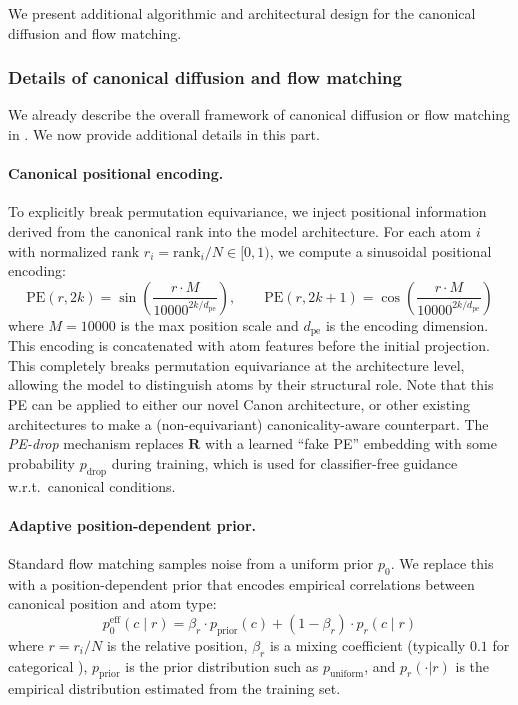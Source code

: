 \documentclass{article}
\theoremstyle{plain}
\theoremstyle{definition}
\theoremstyle{remark}
\newcommand{\1}{\mathbf{1}}
\begin{document}
We present additional algorithmic and architectural design for the canonical diffusion and flow matching.

\subsubsection{Details of canonical diffusion and flow matching}
We already describe the overall framework of canonical diffusion or flow matching in . We now provide additional details in this part.

\paragraph{Canonical positional encoding.} To explicitly break permutation equivariance, we inject positional information derived from the canonical rank into the model architecture. For each atom $i$ with normalized rank $r_i = \text{rank}_i / N \in [0, 1)$, we compute a sinusoidal positional encoding:
\begin{equation}
\text{PE}(r, 2k) = \sin\left(\frac{r \cdot M}{10000^{2k/d_{\text{pe}}}}\right), \qquad \text{PE}(r, 2k+1) = \cos\left(\frac{r \cdot M}{10000^{2k/d_{\text{pe}}}}\right)
\end{equation}
where $M = 10000$ is the max position scale and $d_{\text{pe}}$ is the encoding dimension. This encoding is concatenated with atom features before the initial projection.
This completely breaks permutation equivariance at the architecture level, allowing the model to distinguish atoms by their structural role. Note that this PE can be applied to either our novel Canon architecture, or other existing architectures to make a (non-equivariant) canonicality-aware counterpart.
The \emph{PE-drop} mechanism replaces $\mathbf R$ with a learned ``fake PE'' embedding with some probability $p_{\text{drop}}$ during training, which is used for classifier-free guidance w.r.t.\ canonical conditions. 

\paragraph{Adaptive position-dependent prior.} Standard flow matching samples noise from a uniform prior $p_0$. We replace this with a position-dependent prior that encodes empirical correlations between canonical position and atom type:
\begin{equation}
    p_0^{\text{eff}}(c \mid r) = \beta_r \cdot p_{\text{prior}}(c) + (1 - \beta_r) \cdot p_r(c \mid r)
\end{equation}
where $r = r_i / N$ is the relative position, $\beta_r$ is a mixing coefficient (typically $0.1$ for categorical ), $p_{\text{prior}}$ is the prior distribution such as $p_{\text{uniform}}$, and $p_r(\cdot|r)$ is the empirical distribution estimated from the training set.
\end{document}
